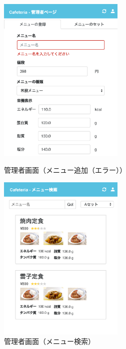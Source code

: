 \documentclass[a4paper]{ltjsarticle}
\begin{document}
    \begin{figure}[ht]
        \begin{minipage}[t]{.49\textwidth}
            \center
            \includegraphics[width=60mm]{ui/admin-home-new-menu-error.png}
            \caption{管理者画面（メニュー追加（エラー））}
            \label{img:admin-home-new-menu-error}
        \end{minipage}
        \begin{minipage}[t]{.49\textwidth}
            \center
            \includegraphics[width=60mm]{ui/admin-menu-search.png}
            \caption{管理者画面（メニュー検索）}
            \label{img:admin-menu-search}
        \end{minipage}
    \end{figure}
\end{document}
